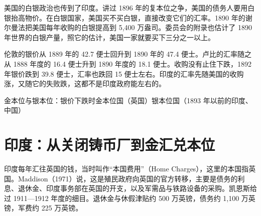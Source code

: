 美国的白银政治也传到了印度。讲过 1896 年的复本位之争，美国的债务人要用白银抬高物价。在白银国家，美国买不买白银，直接改变它们的汇率。1890 年的谢尔曼法把美国每年收购的白银提高到 5,400 万盎司\cite{herschell1893}。委员会的附录也估计了 1890 年世界的白银产量，照它的估计，美国一家就要买下三分之一以上\cite{herschell1893}。

伦敦的银价从 1889 年的 42.7 便士回升到 1890 年的 47.4 便士\cite{lindert2006}。卢比的汇率随之从 1888 年度的 16.4 便士升到 1890 年度的 18.1 便士\cite{herschell1893}。收购没有止住下跌，1892 年银价跌到 39.8 便士，汇率也跌回 15 便士左右\cite{lindert2006,herschell1893}。印度的汇率先随美国的收购涨，又随它的失败跌，这都不是印度政府能左右的。

\begin{compare}{金本位与银本位：银价下跌时}{金本位国（英国）}{银本位国（1893 年以前的印度、中国）}
\end{compare}

\section{印度：从关闭铸币厂到金汇兑本位}\label{sec:periph-india}

印度每年汇往英国的钱，当时叫作“本国费用”（Home Charges），这里的本国指英国\cite{maddison1971}。Maddison（1971）说，这是殖民政府向英国的官方转移，主要是债务的利息、退休金、印度事务部在英国的开支，以及军需品与铁路设备的采购\cite{maddison1971}。凯恩斯给过 1911—1912 年度的细目。退休金与休假津贴约 500 万英镑，债务约 1,100 万英镑，军费约 225 万英镑\cite{keynes1913}。

